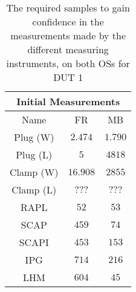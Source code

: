 \begin{table}[H]
    \centering
    \begin{tabular}{|| c | c | c ||}
    \hline
    \multicolumn{3}{||c||}{Initial Measurements} \\ [0.5ex] \hline\hline
    Name & FR & MB \\\hline
    Plug (W) & $2.474$ & $1.790$ \\
    Plug (L) & $5$ & $4818$ \\
    Clamp (W) & $16.908$ & $2855$ \\
    Clamp (L) & $???$ & $???$ \\
    RAPL & $52$ & $53$ \\
    SCAP & $459$ & $74$ \\
    SCAPI & $453$ & $153$ \\
    IPG & $714$ & $216$ \\
    LHM & $604$ & $45$ \\\hline
    \end{tabular}
    \caption{The required samples to gain confidence in the measurements made by the different measuring instruments, on both OSs for DUT 1}
    \label{tab:initial-measurements-exp-2-dut-1}
\end{table}